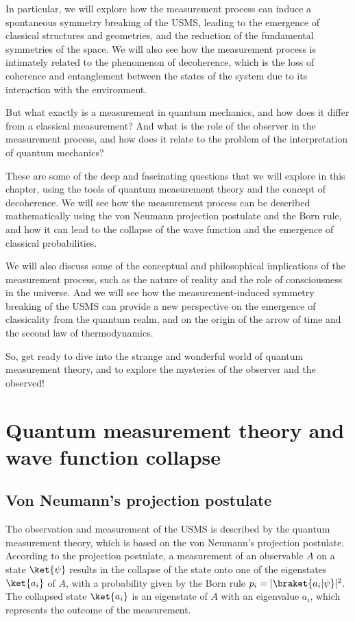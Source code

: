 In particular, we will explore how the measurement process can induce a spontaneous symmetry breaking of the USMS, leading to the emergence of classical structures and geometries, and the reduction of the fundamental symmetries of the space. We will also see how the measurement process is intimately related to the phenomenon of decoherence, which is the loss of coherence and entanglement between the states of the system due to its interaction with the environment.

But what exactly is a measurement in quantum mechanics, and how does it differ from a classical measurement? And what is the role of the observer in the measurement process, and how does it relate to the problem of the interpretation of quantum mechanics?

These are some of the deep and fascinating questions that we will explore in this chapter, using the tools of quantum measurement theory and the concept of decoherence. We will see how the measurement process can be described mathematically using the von Neumann projection postulate and the Born rule, and how it can lead to the collapse of the wave function and the emergence of classical probabilities.

We will also discuss some of the conceptual and philosophical implications of the measurement process, such as the nature of reality and the role of consciousness in the universe. And we will see how the measurement-induced symmetry breaking of the USMS can provide a new perspective on the emergence of classicality from the quantum realm, and on the origin of the arrow of time and the second law of thermodynamics.

So, get ready to dive into the strange and wonderful world of quantum measurement theory, and to explore the mysteries of the observer and the observed!

\section{Quantum measurement theory and wave function collapse}
\subsection{Von Neumann's projection postulate}
The observation and measurement of the USMS is described by the quantum measurement theory, which is based on the von Neumann's projection postulate. According to the projection postulate, a measurement of an observable $A$ on a state $\ket{\psi}$ results in the collapse of the state onto one of the eigenstates $\ket{a_i}$ of $A$, with a probability given by the Born rule $p_i = |\braket{a_i|\psi}|^2$. The collapsed state $\ket{a_i}$ is an eigenstate of $A$ with an eigenvalue $a_i$, which represents the outcome of the measurement.


